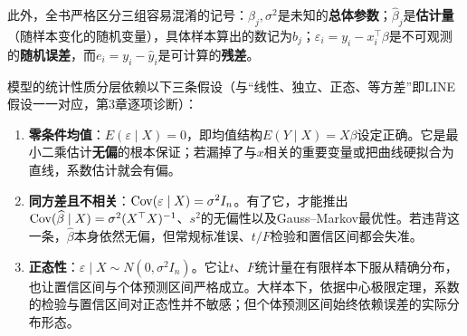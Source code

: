 此外，全书严格区分三组容易混淆的记号：$\beta_j,\sigma^2$是未知的\textbf{总体参数}；$\widehat\beta_j$是\textbf{估计量}（随样本变化的随机变量），具体样本算出的数记为$b_j$；$\varepsilon_i=y_i-x_i^\top\beta$是不可观测的\textbf{随机误差}，而$e_i=y_i-\widehat y_i$是可计算的\textbf{残差}。

模型的统计性质分层依赖以下三条假设（与“线性、独立、正态、等方差”即LINE假设一一对应，第3章逐项诊断）：
\begin{enumerate}
\item \textbf{零条件均值}：$E(\varepsilon\mid X)=0$，即均值结构$E(Y\mid X)=X\beta$设定正确。它是最小二乘估计\textbf{无偏}的根本保证；若漏掉了与$x$相关的重要变量或把曲线硬拟合为直线，系数估计就会有偏。
\item \textbf{同方差且不相关}：$\operatorname{Cov}(\varepsilon\mid X)=\sigma^2I_n$。有了它，才能推出$\operatorname{Cov}(\widehat\beta\mid X)=\sigma^2(X^\top X)^{-1}$、$s^2$的无偏性以及Gauss--Markov最优性。若违背这一条，$\widehat\beta$本身依然无偏，但常规标准误、$t/F$检验和置信区间都会失准。
\item \textbf{正态性}：$\varepsilon\mid X\sim N(0,\sigma^2I_n)$。它让$t$、$F$统计量在有限样本下服从精确分布，也让置信区间与个体预测区间严格成立。大样本下，依据中心极限定理，系数的检验与置信区间对正态性并不敏感；但个体预测区间始终依赖误差的实际分布形态。
\end{enumerate}

